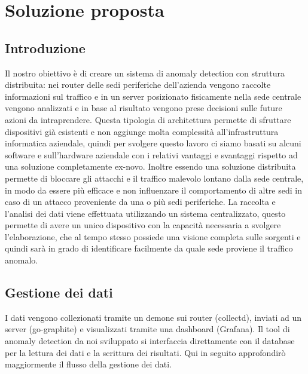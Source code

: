 \chapter{Soluzione proposta}

\section{Introduzione}
Il nostro obiettivo è di creare un sistema di anomaly detection con struttura distribuita: nei router delle sedi periferiche dell'azienda vengono raccolte informazioni sul traffico e in un server posizionato fisicamente nella sede centrale vengono analizzati e in base al risultato vengono prese decisioni sulle future azioni da intraprendere. Questa tipologia di architettura permette di sfruttare dispositivi già esistenti e non aggiunge molta complessità all'infrastruttura informatica aziendale, quindi per svolgere questo lavoro ci siamo basati su alcuni software e sull'hardware aziendale con i relativi vantaggi e svantaggi rispetto ad una soluzione completamente ex-novo.
Inoltre essendo una soluzione distribuita permette di bloccare gli attacchi e il traffico malevolo lontano dalla sede centrale, in modo da essere più efficace e non influenzare il comportamento di altre sedi in caso di un attacco proveniente da una o più sedi periferiche.
La raccolta e l'analisi dei dati viene effettuata utilizzando un sistema centralizzato, questo permette di avere un unico dispositivo con la capacità necessaria a svolgere l'elaborazione, che al tempo stesso possiede una visione completa sulle sorgenti e quindi sarà in grado di identificare facilmente da quale sede proviene il traffico anomalo.


\section{Gestione dei dati}

I dati vengono collezionati tramite un demone sui router (collectd), inviati ad un server (go-graphite) e visualizzati tramite una dashboard (Grafana). Il tool di anomaly detection da noi sviluppato si interfaccia direttamente con il database per la lettura dei dati e la scrittura dei risultati.
Qui in seguito approfondirò maggiormente il flusso della gestione dei dati.


